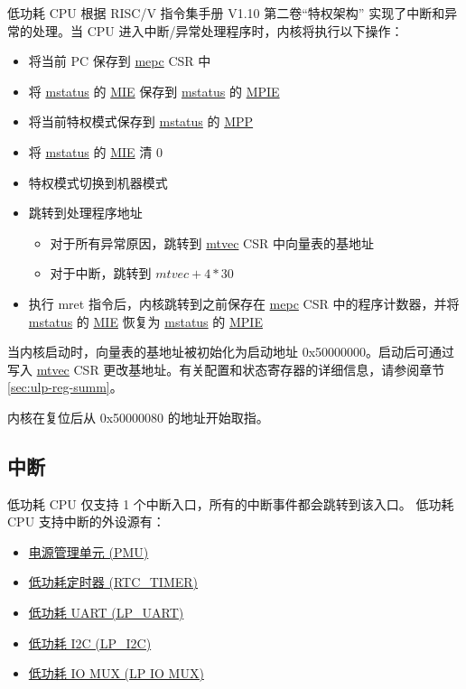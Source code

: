 \documentclass[main\_\_CN.tex]{subfiles}
\begin{document}
低功耗 CPU 根据 RISC\-/V 指令集手册 V1.10 第二卷“特权架构” 实现了中断和异常的处理。当 CPU 进入中断/异常处理程序时，内核将执行以下操作：
\begin{itemize}
    \item 将当前 PC 保存到 \hyperref[regdesc:LPMEPC]{mepc} CSR 中
    \item 将 \hyperref[regdesc:LPMSTATUS]{mstatus} 的 \hyperref[fielddesc:LPMSTATUSMIE]{MIE} 保存到 \hyperref[regdesc:LPMSTATUS]{mstatus} 的 \hyperref[fielddesc:LPMSTATUSMPIE]{MPIE}
    \item 将当前特权模式保存到 \hyperref[regdesc:LPMSTATUS]{mstatus} 的 \hyperref[fielddesc:LPMSTATUSMPP]{MPP}
    \item 将 \hyperref[regdesc:LPMSTATUS]{mstatus} 的 \hyperref[fielddesc:LPMSTATUSMIE]{MIE}  清 0
    \item 特权模式切换到机器模式
    \item 跳转到处理程序地址
        \begin{itemize}
            \item 对于所有异常原因，跳转到 \hyperref[regdesc:LPMTVEC]{mtvec} CSR 中向量表的基地址
            \item 对于中断，跳转到 $mtvec + 4*30$
        \end{itemize}
    \item 执行 mret 指令后，内核跳转到之前保存在 \hyperref[regdesc:LPMEPC]{mepc} CSR 中的程序计数器，并将 \hyperref[regdesc:LPMSTATUS]{mstatus} 的 \hyperref[fielddesc:LPMSTATUSMIE]{MIE} 恢复为 \hyperref[regdesc:LPMSTATUS]{mstatus} 的 \hyperref[fielddesc:LPMSTATUSMPIE]{MPIE}
\end{itemize}


当内核启动时，向量表的基地址被初始化为启动地址 0x50000000。启动后可通过写入 \hyperref[regdesc:LPMTVEC]{mtvec} CSR 更改基地址。有关配置和状态寄存器的详细信息，请参阅章节 \ref{sec:ulp-reg-summ}。

内核在复位后从 0x50000080 的地址开始取指。

\subsection{中断}\label{sec:ulp-intr}



\chipname{} 低功耗 CPU 仅支持 1 个中断入口，所有的中断事件都会跳转到该入口。\chipname{} 低功耗 CPU 支持中断的外设源有：
\begin{itemize}
    \item \hyperref[mod:lowpowm]{电源管理单元 (PMU)}
    \item \hyperref[mod:lowpowm]{低功耗定时器 (RTC\_TIMER)}
    \item \hyperref[mod:uart]{低功耗 UART (LP\_UART)}
    \item \hyperref[mod:i2c]{低功耗 I2C (LP\_I2C)}
    \item \hyperref[mod:iomuxgpio]{低功耗 IO MUX (LP IO MUX)}
\end{itemize}
\end{document}
